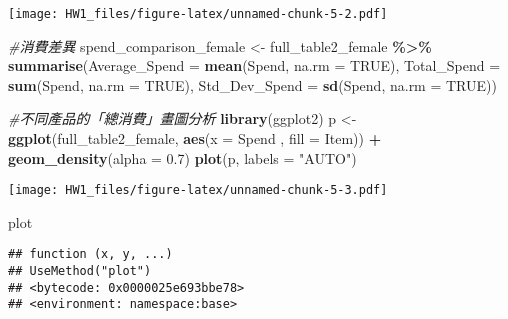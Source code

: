 \documentclass[
]{article}
\newenvironment{Shaded}{\begin{snugshade}}{\end{snugshade}}
\newcommand{\AttributeTok}[1]{\textcolor[rgb]{0.13,0.29,0.53}{#1}}
\newcommand{\CommentTok}[1]{\textcolor[rgb]{0.56,0.35,0.01}{\textit{#1}}}
\newcommand{\ConstantTok}[1]{\textcolor[rgb]{0.56,0.35,0.01}{#1}}
\newcommand{\FloatTok}[1]{\textcolor[rgb]{0.00,0.00,0.81}{#1}}
\newcommand{\FunctionTok}[1]{\textcolor[rgb]{0.13,0.29,0.53}{\textbf{#1}}}
\newcommand{\NormalTok}[1]{#1}
\newcommand{\OtherTok}[1]{\textcolor[rgb]{0.56,0.35,0.01}{#1}}
\newcommand{\SpecialCharTok}[1]{\textcolor[rgb]{0.81,0.36,0.00}{\textbf{#1}}}
\newcommand{\StringTok}[1]{\textcolor[rgb]{0.31,0.60,0.02}{#1}}
\begin{document}
\texttt{[image: HW1\_files/figure-latex/unnamed-chunk-5-2.pdf]}

\begin{Shaded}
\begin{Highlighting}[]
\CommentTok{\#消費差異}
\NormalTok{spend\_comparison\_female }\OtherTok{\textless{}{-}}\NormalTok{ full\_table2\_female }\SpecialCharTok{\%\textgreater{}\%}
  \FunctionTok{summarise}\NormalTok{(}\AttributeTok{Average\_Spend =} \FunctionTok{mean}\NormalTok{(Spend, }\AttributeTok{na.rm =} \ConstantTok{TRUE}\NormalTok{),}
            \AttributeTok{Total\_Spend =} \FunctionTok{sum}\NormalTok{(Spend, }\AttributeTok{na.rm =} \ConstantTok{TRUE}\NormalTok{),}
            \AttributeTok{Std\_Dev\_Spend =} \FunctionTok{sd}\NormalTok{(Spend, }\AttributeTok{na.rm =} \ConstantTok{TRUE}\NormalTok{))}

\CommentTok{\#不同產品的「總消費」畫圖分析}
\FunctionTok{library}\NormalTok{(ggplot2)}
\NormalTok{p }\OtherTok{\textless{}{-}} \FunctionTok{ggplot}\NormalTok{(full\_table2\_female, }\FunctionTok{aes}\NormalTok{(}\AttributeTok{x =}\NormalTok{ Spend , }\AttributeTok{fill =}\NormalTok{ Item)) }\SpecialCharTok{+} \FunctionTok{geom\_density}\NormalTok{(}\AttributeTok{alpha =} \FloatTok{0.7}\NormalTok{)}
\FunctionTok{plot}\NormalTok{(p, }\AttributeTok{labels =} \StringTok{"AUTO"}\NormalTok{)}
\end{Highlighting}
\end{Shaded}

\texttt{[image: HW1\_files/figure-latex/unnamed-chunk-5-3.pdf]}

\begin{Shaded}
\begin{Highlighting}[]
\NormalTok{plot}
\end{Highlighting}
\end{Shaded}

\begin{verbatim}
## function (x, y, ...) 
## UseMethod("plot")
## <bytecode: 0x0000025e693bbe78>
## <environment: namespace:base>
\end{verbatim}
\end{document}
